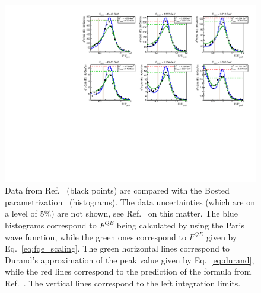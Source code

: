 \begin{figure}[htp]
\begin{center}
\includegraphics[width=15cm]{pictures/normalization/hanson.pdf}
\caption{\small  Data from Ref.~\cite{Hanson:1973vf} (black points) are compared with the Bosted parametrization~\cite{Bosted_fit,Bosted:2007xd} (histograms). The data uncertainties (which are on a level of 5\%) are not shown, see Ref.~\cite{Hanson:1973vf} on this matter. The blue histograms correspond to $F^{QE}$ being calculated by using the Paris wave function, while the green ones correspond to $F^{QE}$ given by Eq.~\eqref{eq:fqe_scaling}. The green horizontal lines correspond to Durand's approximation of the peak value given by Eq.~\eqref{eq:durand}, while the red lines correspond to the prediction of the formula from Ref.~\cite{Kocevar:1967}. The vertical lines correspond to the left integration limits.} \label{fig:hanson_QE}
\end{center}
\end{figure}





